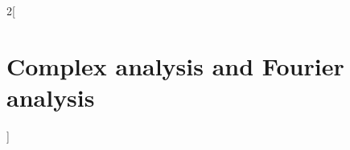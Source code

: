 \documentclass[../../../main.tex]{subfiles}
\begin{document}
\begin{multicols}{2}[\section{Complex analysis and Fourier analysis}]

\end{multicols}
\end{document}
